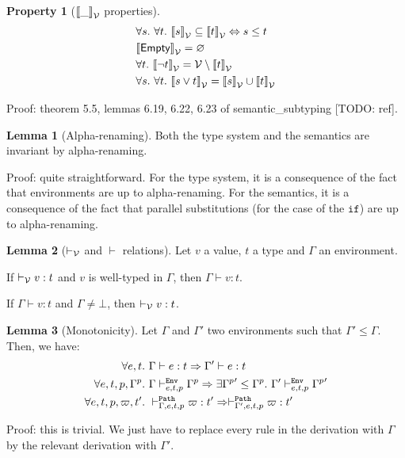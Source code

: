\documentclass[a4paper]{article}
\theoremstyle{definition}
\newtheorem{lemma}{Lemma}
\newtheorem{property}{Property}
\begin{document}
        \begin{property}[$\valsemantic \_$ properties]
          \begin{align*}
            &\forall s.\ \forall t.\ \valsemantic s \subseteq \valsemantic t \Leftrightarrow s \leq t\\
            &\valsemantic \Empty = \varnothing\\
            &\forall t.\ \valsemantic {\neg t} = \values \setminus \valsemantic t\\
            &\forall s.\ \forall t.\ \valsemantic {s\vee t} = \valsemantic s \cup \valsemantic t
          \end{align*}
        \end{property}
        Proof: theorem 5.5, lemmas 6.19, 6.22, 6.23 of semantic_subtyping [TODO: ref].

        \begin{lemma}[Alpha-renaming]
          Both the type system and the semantics are invariant by alpha-renaming.
        \end{lemma}
        Proof: quite straightforward.
        For the type system, it is a consequence of the fact that environments are up to alpha-renaming.
        For the semantics, it is a consequence of the fact that parallel substitutions (for the case of the $\texttt{if}$)
        are up to alpha-renaming.

        \begin{lemma}[$\vvdash$ and $\vdash$ relations]Let $v$ a value, $t$ a type and $\Gamma$ an environment.

          If $\vvdash v:t$ and $v$ is well-typed in $\Gamma$, then $\Gamma\vdash v:t$.

          If $\Gamma \vdash v:t$ and $\Gamma\neq\bot$, then $\vvdash v:t$.
        \end{lemma}
    
        \begin{lemma}[Monotonicity]
          Let $\Gamma$ and $\Gamma'$ two environments such that $\Gamma' \leq \Gamma$.
          Then, we have:
          \begin{align*}
            \forall e,t.\ &\Gamma \vdash e:t \Rightarrow \Gamma' \vdash e:t\\
            \forall e,t,p,\Gamma^p.\ &\Gamma \evdash p e t \Gamma^p \Rightarrow \exists {\Gamma^p}'\leq \Gamma^p.\ \Gamma' \evdash p e t {\Gamma^p}'\\
            \forall e,t,p,\varpi,t'.\ &\pvdash \Gamma p e t \varpi:t' \Rightarrow \pvdash {\Gamma'} p e t \varpi:t'
          \end{align*}
        \end{lemma}
        Proof: this is trivial. We just have to replace every  rule in the derivation with $\Gamma$
        by the relevant derivation with $\Gamma'$.
\end{document}
